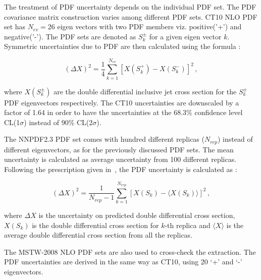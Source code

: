 The treatment of PDF uncertainty depends on the individual PDF set. The PDF covariance matrix construction varies among different PDF sets. CT10 NLO PDF set has $N_{ev}=$26 eigen vectors with two PDF members viz. positive('+') and negative('-'). The PDF sets are denoted as $S_k^{\pm}$ for a given eigen vector $k$. Symmetric uncertainties due to PDF are then calculated using the formula \cite{CT10ERR}:

\begin{equation}
(\Delta X)^2 = \frac{1}{4} \sum_{k=1}^{N_{ev}} [X(S_k^{+}) - X(S_k^{-})]^2 \,,
\end{equation}

where $X(S_k^{\pm})$ are the double differential inclusive jet cross section for the $S_k^{\pm}$ PDF eigenvectors respectively.
The CT10 uncertainties are downscaled by a factor of 1.64 in order to have the uncertainties at the 68.3\% confidence level CL(1$\sigma$)
instead of 90\% CL(2$\sigma$).  


The NNPDF2.3 PDF set comes with hundred different replicas ($N_{rep}$) instead of different eigenvectors, as for the previously discussed PDF sets. The mean uncertainty is calculated as average uncertainty from 100 different replicas. Following the prescription given in~\cite{NNPDFERR}, the PDF uncertainty is calculated as :

\begin{equation}
(\Delta X)^2 = \frac{1}{N_{rep}-1} \sum_{k=1}^{N_{rep}} [X(S_k) - \langle X(S_k) \rangle]^2 \,,
\end{equation}

where $\Delta X$ is the uncertainty on predicted double differential cross section, $X(S_k)$ is the double differential cross section for $k$-th replica and $\langle X \rangle$ is the average double differential cross section from all the replicas. 

The MSTW-2008 NLO PDF sets are also used to cross-check the \alpsmz extraction. The PDF uncertainties are derived in the same way as CT10, using 20 `+' and `-' eigenvectors.

